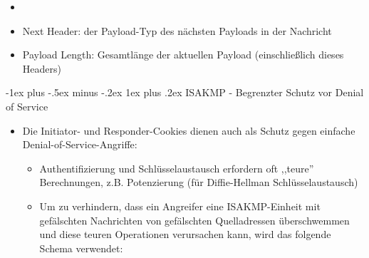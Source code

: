 \documentclass[a4paper]{article}
\makeatletter
\renewcommand{\subsubsection}{\@startsection{subsubsection}{3}{0mm}%
 {-1ex plus -.5ex minus -.2ex}%
 {1ex plus .2ex}%
 {\normalfont\small\bfseries}}
\makeatother
\begin{document}
\begin{multicols}{3}
\begin{itemize}
\begin{itemize}
                        \begin{itemize}
                            \item
                            \item
                                  Next Header: der Payload-Typ des nächsten Payloads in der
                                  Nachricht
                            \item
                                  Payload Length: Gesamtlänge der aktuellen Payload (einschließlich
                                  dieses Headers)
                        \end{itemize}
              \end{itemize}
    \end{itemize}


    \subsubsection{ISAKMP - Begrenzter Schutz vor Denial of
        Service}

    \begin{itemize}
        \item
              Die Initiator- und Responder-Cookies dienen auch als Schutz gegen
              einfache Denial-of-Service-Angriffe:

              \begin{itemize}
                  \item
                        Authentifizierung und Schlüsselaustausch erfordern oft ,,teure''
                        Berechnungen, z.B. Potenzierung (für Diffie-Hellman
                        Schlüsselaustausch)
                  \item
                        Um zu verhindern, dass ein Angreifer eine ISAKMP-Einheit mit
                        gefälschten Nachrichten von gefälschten Quelladressen überschwemmen
                        und diese teuren Operationen verursachen kann, wird das folgende
                        Schema verwendet:


\end{itemize}
\end{itemize}
\end{multicols}
\end{document}
